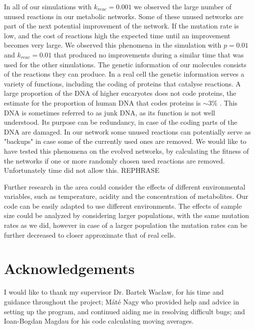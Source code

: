 \documentclass[a4paper,12pt]{article}
\begin{document}
	In all of our simulations with $k_{reac}=0.001$ we observed the large number of unused reactions in our metabolic networks. Some of these unused networks are part of the next potential improvement of the network. If the mutation rate is low, and the cost of reactions high the expected time until an improvement becomes very large. We observed this phenomena in the simulation with $p=0.01$ and $k_{reac}=0.01$ that produced no improvements during a similar time that was used for the other simulations. The genetic information of our molecules consists of the reactions they can produce. In a real cell the genetic information serves a variety of functions, including the coding of proteins that catalyse reactions. A large proportion of the DNA of higher eucaryotes does not code proteins, the estimate for the proportion of human DNA that codes proteins is $\sim 3\%$ \cite{junkdna}. This DNA is sometimes referred to as junk DNA, as its function is not well understood. Its purpose can be redundancy, in case of the coding parts of the DNA are damaged. In our network some unused reactions can potentially serve as "backups" in case some of the currently used ones are removed. We would like to have tested this phenomena on the evolved networks, by calculating the fitness of the networks if one or more randomly chosen used reactions are removed. Unfortunately time did not allow this.  REPHRASE
	
	
	
	Further research in the area could consider the effects of different environmental variables, such as temperature, acidity and the concentration of metabolites. Our code can be easily adapted to use different environments. The effects of sample size could be analyzed by considering larger populations, with the same mutation rates as we did, however in case of a larger population the mutation rates can be further decreased to closer approximate that of real cells. 
	
	
	\section*{Acknowledgements}
	
	I would like to thank my supervisor Dr. Bartek Waclaw, for his time and guidance throughout the project; Máté Nagy who provided help and advice in setting up the program, and continued aiding me in resolving difficult bugs; and Ioan-Bogdan Magdau for his code calculating moving averages. 

	
	

\end{document}
